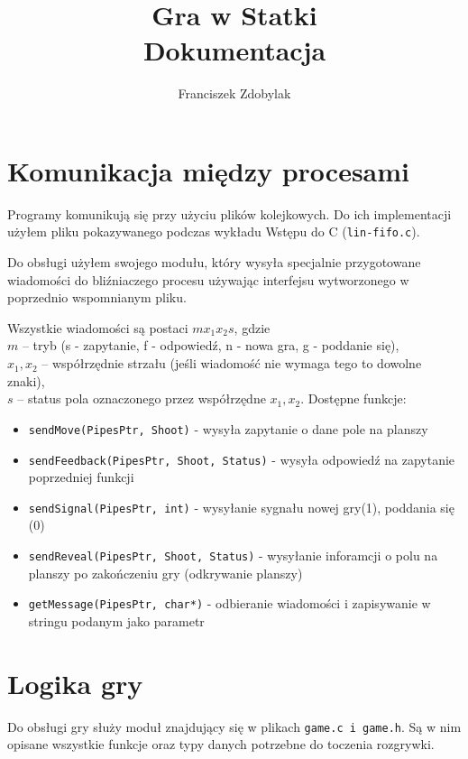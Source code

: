 \documentclass[a4paper]{article}
\author{Franciszek Zdobylak}
\title{\Huge{\bf{Gra w Statki}}\\
				\small Dokumentacja}
\begin{document}
\maketitle

\section{Komunikacja między procesami}
    Programy komunikują się przy użyciu plików kolejkowych. Do ich implementacji użyłem pliku pokazywanego podczas wykładu 
    Wstępu do C (\texttt{lin-fifo.c}). 

    Do obsługi użyłem swojego modułu, który wysyła specjalnie przygotowane wiadomości do bliźniaczego procesu używając
interfejsu wytworzonego w poprzednio wspomnianym pliku. 

Wszystkie wiadomości są postaci $mx_{1}x_{2}s$, gdzie \\
$m$ -- tryb (s - zapytanie, f - odpowiedź, n - nowa gra, g - poddanie się), \\
$x_{1},x_{2}$ -- współrzędnie strzału (jeśli wiadomość nie wymaga tego to dowolne znaki), \\
$s$ -- status pola oznaczonego przez współrzędne $x_{1}, x_{2}$. 
Dostępne funkcje:
\begin{itemize}
    \item \texttt{sendMove(PipesPtr, Shoot)} - wysyła zapytanie o dane pole na planszy
    \item \texttt{sendFeedback(PipesPtr, Shoot, Status)} - wysyła odpowiedź na zapytanie poprzedniej funkcji
    \item \texttt{sendSignal(PipesPtr, int)} - wysyłanie sygnału nowej gry(1), poddania się (0)
    \item \texttt{sendReveal(PipesPtr, Shoot, Status)} - wysyłanie inforamcji o polu na planszy po zakończeniu gry (odkrywanie planszy)
    \item \texttt{getMessage(PipesPtr, char*)} - odbieranie wiadomości i zapisywanie w stringu podanym jako parametr
    \end{itemize}

\section{Logika gry}
    Do obsługi gry służy moduł znajdujący się w plikach \texttt{game.c i game.h}. 
Są w nim opisane wszystkie funkcje oraz typy danych potrzebne do toczenia rozgrywki.
\end{document}
